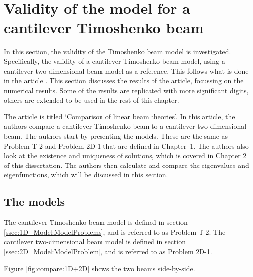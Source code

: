 \documentclass[../../main.tex]{subfiles}
\begin{document}
\section{Validity of the model for a cantilever Timoshenko beam} \label{sec:validity-of-a-cantilever-timoshenko-beam}

In this section, the validity of the Timoshenko beam model is investigated. Specifically, the validity of a cantilever Timoshenko beam model, using a cantilever two-dimensional beam model as a reference. This follows what is done in the article \cite{LVV09}. This section discusses the results of the article, focussing on the numerical results. Some of the results are replicated with more significant digits, others are extended to be used in the rest of this chapter.

The article \cite{LVV09} is titled `Comparison of linear beam theories'. In this article, the authors compare a cantilever Timoshenko beam to a cantilever two-dimensional beam. The authors start by presenting the models. These are the same as Problem T-2 and Problem 2D-1 that are defined in Chapter~1. The authors also look at the existence and uniqueness of solutions, which is covered in Chapter 2 of this dissertation. The authors then calculate and compare the eigenvalues and eigenfunctions, which will be discussed in this section.

\subsection{The models}
The cantilever Timoshenko beam model is defined in section \ref{ssec:1D_Model:ModelProblems}, and is referred to as Problem T-2. The cantilever two-dimensional beam model is defined in section \ref{ssec:2D_Model:ModelProblem}, and is referred to as Problem 2D-1.

Figure \ref{fig:compare:1D+2D} shows the two beams side-by-side.
\end{document}
